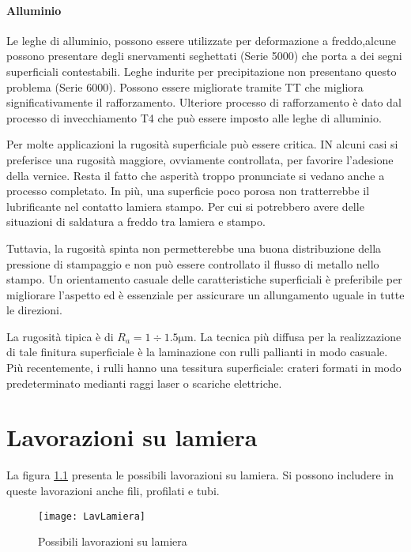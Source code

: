 \subsubsection{Alluminio}
Le leghe di alluminio, possono essere utilizzate per deformazione a freddo,alcune possono presentare degli snervamenti seghettati (Serie 5000) che porta a dei segni superficiali contestabili. Leghe indurite per precipitazione non presentano questo problema (Serie 6000).
Possono essere migliorate tramite \ac{TT} che migliora significativamente il rafforzamento. 
Ulteriore processo di rafforzamento è dato dal processo di invecchiamento T4 che può essere imposto alle leghe di alluminio.

Per molte applicazioni la rugosità superficiale può essere critica.
IN alcuni casi si preferisce una rugosità maggiore, ovviamente controllata, per favorire l'adesione della vernice. Resta il fatto che asperità troppo pronunciate si vedano anche a processo completato. In più, una superficie poco porosa non tratterrebbe il lubrificante nel contatto lamiera stampo. Per cui si potrebbero avere delle situazioni di saldatura a freddo tra lamiera e stampo.

Tuttavia, la rugosità spinta non permetterebbe una buona distribuzione della pressione di stampaggio e non può essere controllato il flusso di metallo nello stampo.
Un orientamento casuale delle caratteristiche superficiali è preferibile per migliorare l'aspetto ed è essenziale per assicurare un allungamento uguale in tutte le direzioni.

La rugosità tipica è di $R_a = 1 \div 1.5\unit{\um}$.
La tecnica più diffusa per la realizzazione di tale finitura superficiale è la laminazione con rulli pallianti in modo casuale.
Più recentemente, i rulli hanno una tessitura superficiale: crateri formati in modo predeterminato medianti raggi laser o scariche elettriche.


\chapter{Lavorazioni su lamiera}
La figura \ref{fig:LavLamiera} presenta le possibili lavorazioni su lamiera.
Si possono includere in queste lavorazioni anche fili, profilati e tubi.

\begin{figure}
\centering
\texttt{[image: LavLamiera]}
\caption{Possibili lavorazioni su lamiera}
\label{fig:LavLamiera}
\end{figure}

